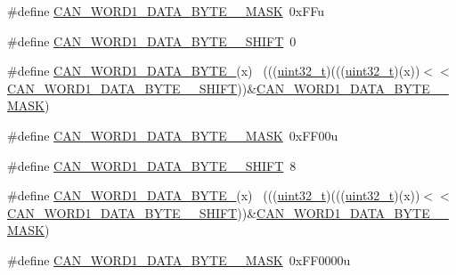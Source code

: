 \begin{DoxyCompactItemize}
\item 
\#define \hyperlink{group___c_a_n___register___masks_ga55f9bc8ccdbb2f34f1b571eff8481537}{C\+A\+N\+\_\+\+W\+O\+R\+D1\+\_\+\+D\+A\+T\+A\+\_\+\+B\+Y\+T\+E\+\_\+\_\+\+M\+A\+SK}~0x\+F\+Fu
\item 
\#define \hyperlink{group___c_a_n___register___masks_gacff5d21eb80fe537f40b518e58750186}{C\+A\+N\+\_\+\+W\+O\+R\+D1\+\_\+\+D\+A\+T\+A\+\_\+\+B\+Y\+T\+E\+\_\+\_\+\+S\+H\+I\+FT}~0
\item 
\#define \hyperlink{group___c_a_n___register___masks_ga17b41e838c3daa9752f0237ae658daed}{C\+A\+N\+\_\+\+W\+O\+R\+D1\+\_\+\+D\+A\+T\+A\+\_\+\+B\+Y\+T\+E\+\_}(x)                              ~(((\hyperlink{_p_e___types_8h_a33594304e786b158f3fb30289278f5af}{uint32\+\_\+t})(((\hyperlink{_p_e___types_8h_a33594304e786b158f3fb30289278f5af}{uint32\+\_\+t})(x))$<$$<$\hyperlink{group___c_a_n___register___masks_gacff5d21eb80fe537f40b518e58750186}{C\+A\+N\+\_\+\+W\+O\+R\+D1\+\_\+\+D\+A\+T\+A\+\_\+\+B\+Y\+T\+E\+\_\+\_\+\+S\+H\+I\+FT}))\&\hyperlink{group___c_a_n___register___masks_ga55f9bc8ccdbb2f34f1b571eff8481537}{C\+A\+N\+\_\+\+W\+O\+R\+D1\+\_\+\+D\+A\+T\+A\+\_\+\+B\+Y\+T\+E\+\_\+\_\+\+M\+A\+SK})
\item 
\#define \hyperlink{group___c_a_n___register___masks_ga2a3649044e37e695317cff5b42d9c4f1}{C\+A\+N\+\_\+\+W\+O\+R\+D1\+\_\+\+D\+A\+T\+A\+\_\+\+B\+Y\+T\+E\+\_\+\_\+\+M\+A\+SK}~0x\+F\+F00u
\item 
\#define \hyperlink{group___c_a_n___register___masks_gadfb68bcd398c238b56d716fa3a8ec4ee}{C\+A\+N\+\_\+\+W\+O\+R\+D1\+\_\+\+D\+A\+T\+A\+\_\+\+B\+Y\+T\+E\+\_\+\_\+\+S\+H\+I\+FT}~8
\item 
\#define \hyperlink{group___c_a_n___register___masks_ga96fbf644e731994ebf8519bd156c675f}{C\+A\+N\+\_\+\+W\+O\+R\+D1\+\_\+\+D\+A\+T\+A\+\_\+\+B\+Y\+T\+E\+\_}(x)                              ~(((\hyperlink{_p_e___types_8h_a33594304e786b158f3fb30289278f5af}{uint32\+\_\+t})(((\hyperlink{_p_e___types_8h_a33594304e786b158f3fb30289278f5af}{uint32\+\_\+t})(x))$<$$<$\hyperlink{group___c_a_n___register___masks_gadfb68bcd398c238b56d716fa3a8ec4ee}{C\+A\+N\+\_\+\+W\+O\+R\+D1\+\_\+\+D\+A\+T\+A\+\_\+\+B\+Y\+T\+E\+\_\+\_\+\+S\+H\+I\+FT}))\&\hyperlink{group___c_a_n___register___masks_ga2a3649044e37e695317cff5b42d9c4f1}{C\+A\+N\+\_\+\+W\+O\+R\+D1\+\_\+\+D\+A\+T\+A\+\_\+\+B\+Y\+T\+E\+\_\+\_\+\+M\+A\+SK})
\item 
\#define \hyperlink{group___c_a_n___register___masks_ga9762ba9b3f8288f68e3db1e0d2deccaf}{C\+A\+N\+\_\+\+W\+O\+R\+D1\+\_\+\+D\+A\+T\+A\+\_\+\+B\+Y\+T\+E\+\_\+\_\+\+M\+A\+SK}~0x\+F\+F0000u

\end{DoxyCompactItemize}

